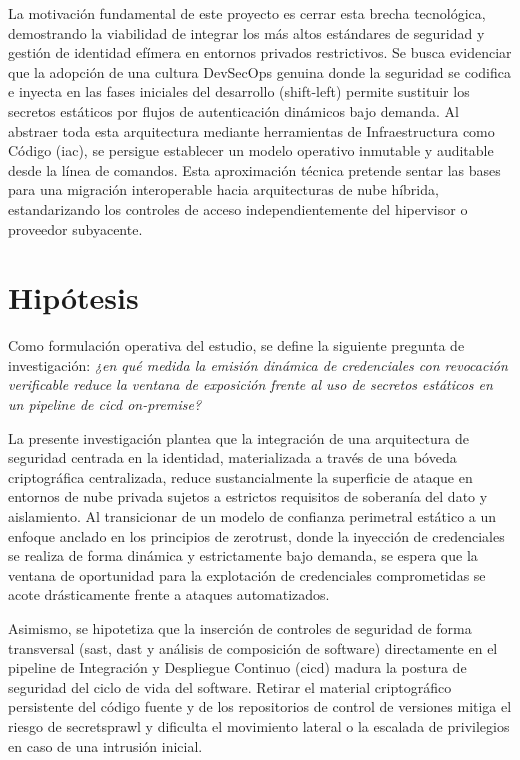 \documentclass[runningheads]{llncs}
\begin{document}
La motivación fundamental de este proyecto es cerrar esta brecha tecnológica, demostrando la viabilidad de integrar los más altos estándares de seguridad y gestión de identidad efímera en entornos privados restrictivos. Se busca evidenciar que la adopción de una cultura DevSecOps genuina donde la seguridad se codifica e inyecta en las fases iniciales del desarrollo (shift-left) permite sustituir los secretos estáticos por flujos de autenticación dinámicos bajo demanda. Al abstraer toda esta arquitectura mediante herramientas de Infraestructura como Código (\gls{iac}), se persigue establecer un modelo operativo inmutable y auditable desde la línea de comandos. Esta aproximación técnica pretende sentar las bases para una migración interoperable hacia arquitecturas de nube híbrida, estandarizando los controles de acceso independientemente del hipervisor o proveedor subyacente.

\section{Hipótesis}

Como formulación operativa del estudio, se define la siguiente pregunta de investigación: \textit{¿en qué medida la emisión dinámica de credenciales con revocación verificable reduce la ventana de exposición frente al uso de secretos estáticos en un pipeline de \gls{cicd} \textit{on-premise}?}

La presente investigación plantea que la integración de una arquitectura de seguridad centrada en la identidad, materializada a través de una bóveda criptográfica centralizada, reduce sustancialmente la superficie de ataque en entornos de nube privada sujetos a estrictos requisitos de soberanía del dato y aislamiento. Al transicionar de un modelo de confianza perimetral estático a un enfoque anclado en los principios de \gls{zerotrust}, donde la inyección de credenciales se realiza de forma dinámica y estrictamente bajo demanda, se espera que la ventana de oportunidad para la explotación de credenciales comprometidas se acote drásticamente frente a ataques automatizados.

Asimismo, se hipotetiza que la inserción de controles de seguridad de forma transversal (\gls{sast}, \gls{dast} y análisis de composición de software) directamente en el pipeline de Integración y Despliegue Continuo (\gls{cicd}) madura la postura de seguridad del ciclo de vida del software. Retirar el material criptográfico persistente del código fuente y de los repositorios de control de versiones mitiga el riesgo de \gls{secretsprawl} y dificulta el movimiento lateral o la escalada de privilegios en caso de una intrusión inicial.
\end{document}
